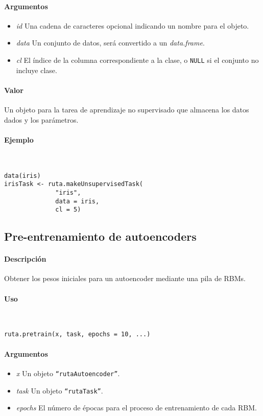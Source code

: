 \paragraph{Argumentos}
\begin{itemize}
\item \emph{id}	Una cadena de caracteres opcional indicando un nombre para el objeto.
\item \emph{data}	Un conjunto de datos, será convertido a un \emph{data.frame}.
\item \emph{cl}	El índice de la columna correspondiente a la clase, o \texttt{NULL} si el conjunto no incluye clase.
\end{itemize}

\paragraph{Valor}
Un objeto para la tarea de aprendizaje no supervisado que almacena los datos dados y los parámetros.

\paragraph{Ejemplo}
~

\begin{lstlisting}
data(iris)
irisTask <- ruta.makeUnsupervisedTask(
              "iris",
              data = iris,
              cl = 5)
\end{lstlisting}

\subsection{Pre-entrenamiento de autoencoders}

\paragraph{Descripción}
Obtener los pesos iniciales para un autoencoder mediante una pila de RBMs.

\paragraph{Uso}
~

\begin{lstlisting}
ruta.pretrain(x, task, epochs = 10, ...)
\end{lstlisting}

\paragraph{Argumentos}
\begin{itemize}
\item \emph{x}	Un objeto \texttt{``rutaAutoencoder''}.
\item \emph{task}	Un objeto \texttt{``rutaTask''}.
\item \emph{epochs}	El número de épocas para el proceso de entrenamiento de cada RBM.
\end{itemize}

